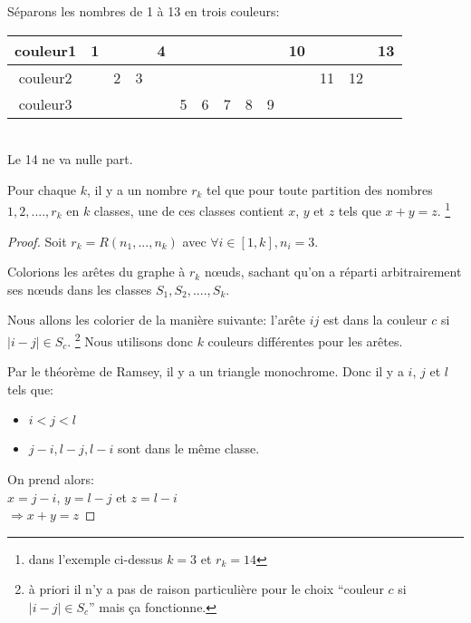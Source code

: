 \begin{myexem}
Séparons les nombres de 1 à 13 en trois couleurs:
\vspace*{0.2cm}

    \begin{tabular}{|c|c|c|c|c|c|c|c|c|c|c|c|c|c|}
        \hline
       couleur1 & 1 &  &  & 4  &  &  &  &  &  & 10 &  &  & 13\\

       \hline
       couleur2 &  & 2 & 3 &  &  &  &  &  &  &  & 11 & 12 &\\

       \hline
       couleur3 &  &  &  &  & 5 & 6 & 7 & 8 & 9 &  &  &  &\\

        \hline
      \end{tabular} \\
      Le 14 ne va nulle part.
\end{myexem}


\begin{mytheo} 
Pour chaque $k$, il y a un nombre $r_k$ tel que pour toute partition des nombres $1,2,....,r_k$ en $k$ classes, une de ces classes contient $x$, $y$ et $z$ tels que $x+y=z$. \footnote{dans l'exemple ci-dessus $k = 3$ et $r_k = 14$}
\begin{proof}
Soit $r_k = R(n_1,...,n_k)$ avec $\forall i \in [1 , k], n_i = 3 $.

Colorions les ar\^etes du graphe à $r_k$ nœuds, sachant qu'on a réparti arbitrairement ses nœuds dans les classes $S_1 ,S_2,....,S_k$.

Nous allons les colorier de la manière suivante: l'ar\^ete $ij$ est dans la couleur $c$ si $\mid i-j \mid \in S_c $.%
\footnote{à priori il n'y a pas de raison particulière pour le choix ``couleur $c$ si $\mid i-j \mid \in S_c $'' mais ça fonctionne.}
Nous utilisons donc $k$ couleurs différentes pour les arêtes.

Par le théorème de Ramsey, il y a un triangle monochrome.
Donc il y a $i$, $j$ et $l$ tels que:
\begin{itemize}
\item
$i < j < l$
\item
$j-i, l-j, l-i$ sont dans le m\^eme classe.
\end{itemize}

On prend alors:\\
$x = j-i$, $y = l-j$ et $z = l-i$\\
$\Rightarrow x+y=z$

\end{proof}
\end{mytheo}


